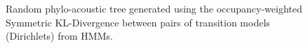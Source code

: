 \documentclass[pdftex,11pt,a4paper]{article}
\theoremstyle{definition}
\theoremstyle{remark}
\begin{document}
\begin{figure}
\noindent{}
    \caption{Random phylo-acoustic tree generated using the occupancy-weighted Symmetric KL-Divergence between pairs of transition models (Dirichlets) from HMMs.}
    \label{fig:rhmmweighted}
\end{figure}
\clearpage
\end{document}
